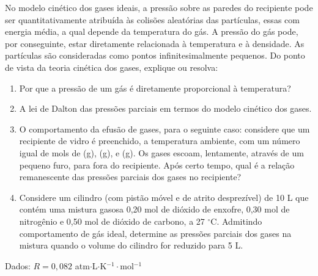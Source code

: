 No modelo cinético dos gases ideais, a pressão sobre as paredes do recipiente pode ser quantitativamente atribuída às colisões aleatórias das partículas, essas com energia média, a qual depende da temperatura do gás. A pressão do gás pode, por conseguinte, estar diretamente relacionada à temperatura e à densidade. As partículas são consideradas como pontos infinitesimalmente pequenos. Do ponto de vista da teoria cinética dos gases, explique ou resolva:

\begin{enumerate}[label = (\alph*)]
	\item Por que a pressão de um gás é diretamente proporcional à temperatura?
	\item A lei de Dalton das pressões parciais em termos do modelo cinético dos gases.
	\item O comportamento da efusão de gases, para o seguinte caso: considere que um recipiente de vidro é preenchido, a temperatura ambiente, com um número igual de mols de (g), (g), e (g). Os gases escoam, lentamente, através de um pequeno furo, para fora do recipiente. Após certo tempo, qual é a relação remanescente das pressões parciais dos gases no recipiente?
	\item Considere um cilindro (com pistão móvel e de atrito desprezível) de 10 L que contém uma mistura gasosa 0,20 mol de dióxido de enxofre, 0,30 mol de nitrogênio e 0,50 mol de dióxido de carbono, a 27 $^\circ$C. Admitindo comportamento de gás ideal, determine as pressões parciais dos gases na mistura quando o volume do cilindro for reduzido para 5 L.
\end{enumerate}

Dados: $R = 0,082$ atm$\cdot$L$\cdot$K$^{-1}\cdot$mol$^{-1}$
